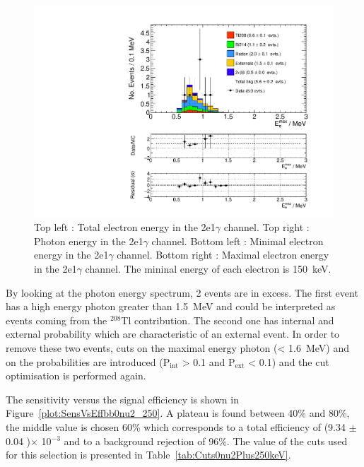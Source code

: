 \documentclass[main.tex]{subfiles}
\begin{document}
\begin{figure} [h!]
\begin{center}
\includegraphics[scale=0.35]{pictures/FinalResults/bb0nu2/150/Eemax_bb0nu2NS.pdf}
\end{center}
\caption{Top left : Total electron energy in the 2e1$\gamma$ channel. Top right : Photon energy in the 2e1$\gamma$ channel. Bottom left : Minimal electron energy in the 2e1$\gamma$ channel. Bottom right : Maximal electron energy in the 2e1$\gamma$ channel. The mininal energy of each electron is 150~keV.}
\label{plot:SEeAndEg250bb0nu2}
\end{figure}


\NI By looking at the photon energy spectrum, 2 events are in excess. The first event has a high energy photon greater than 1.5~MeV and could be interpreted as events coming from the $^{\text{208}}$Tl contribution. The second one has internal and external probability which are characteristic of an external event. In order to remove these two events, cuts on the maximal energy photon (< 1.6~MeV) and on the probabilities are introduced (P$_\text{int}$ > 0.1 and P$_\text{ext}$ < 0.1) and the cut optimisation is performed again.


\FloatBarrier


\bigskip


\NI The sensitivity versus the signal efficiency is shown in Figure~\ref{plot:SensVsEffbb0nu2_250}. A plateau is found between 40\% and 80\%, the middle value is chosen 60\% which corresponds to a total efficiency of (9.34 $\pm$ 0.04 )$\times$ 10$^{-\text{3}}$ and to a background rejection of 96\%. The value of the cuts used for this selection is presented in Table~\ref{tab:Cuts0nu2Plus250keV}. 
\end{document}

